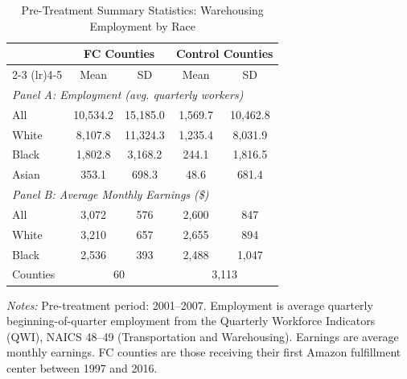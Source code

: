 \begin{table}[t]
\centering
\caption{Pre-Treatment Summary Statistics: Warehousing Employment by Race}
\label{tab:summary}
\begin{threeparttable}
\begin{tabular}{lcccc}
\toprule
& \multicolumn{2}{c}{FC Counties} & \multicolumn{2}{c}{Control Counties} \\
\cmidrule(lr){2-3} \cmidrule(lr){4-5}
& Mean & SD & Mean & SD \\
\midrule
\multicolumn{5}{l}{\textit{Panel A: Employment (avg. quarterly workers)}} \\[3pt]
\quad All & 10,534.2 & 15,185.0 & 1,569.7 & 10,462.8 \\
\quad White & 8,107.8 & 11,324.3 & 1,235.4 & 8,031.9 \\
\quad Black & 1,802.8 & 3,168.2 & 244.1 & 1,816.5 \\
\quad Asian & 353.1 & 698.3 & 48.6 & 681.4 \\
\midrule
\multicolumn{5}{l}{\textit{Panel B: Average Monthly Earnings (\$)}} \\[3pt]
\quad All & 3,072 & 576 & 2,600 & 847 \\
\quad White & 3,210 & 657 & 2,655 & 894 \\
\quad Black & 2,536 & 393 & 2,488 & 1,047 \\
\midrule
Counties & \multicolumn{2}{c}{60} & \multicolumn{2}{c}{3,113} \\
\bottomrule
\end{tabular}
\begin{tablenotes}[flushleft]
\small
\item \textit{Notes:} Pre-treatment period: 2001--2007. Employment is average quarterly beginning-of-quarter employment from the Quarterly Workforce Indicators (QWI), NAICS 48--49 (Transportation and Warehousing). Earnings are average monthly earnings. FC counties are those receiving their first Amazon fulfillment center between 1997 and 2016.
\end{tablenotes}
\end{threeparttable}
\end{table}
